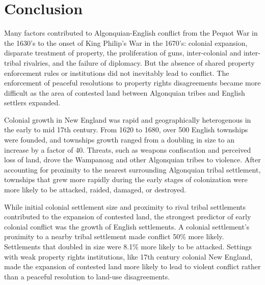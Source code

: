 \documentclass[11pt]{article}
\begin{document}

\section{Conclusion}
Many factors contributed to Algonquian-English conflict from the Pequot War in the 1630's to the onset of King Philip's War in the 1670's:  colonial expansion, disparate treatment of property, the proliferation of guns, inter-colonial and inter-tribal rivalries, and the failure of diplomacy. But the absence of shared property enforcement rules or institutions did not inevitably lead to conflict. The enforcement of peaceful resolutions to property rights disagreements became more difficult as the area of contested land between Algonquian tribes and English settlers expanded. %

Colonial growth in New England was rapid and geographically heterogenous in the early to mid 17th century. From 1620 to 1680, over 500 English townships were founded, and townships growth ranged from a doubling in size to an increase by a factor of 40. Threats, such as weapons confiscation and perceived loss of land, drove the Wampanoag and other Algonquian tribes to violence. After accounting for proximity to the nearest surrounding Algonquian tribal settlement, townships that grew more rapidly during the early stages of colonization were more likely to be attacked, raided, damaged, or destroyed.

While initial colonial settlement size and proximity to rival tribal settlements contributed to the expansion of contested land, the strongest predictor of early colonial conflict was the growth of English settlements. A colonial settlement's proximity to a nearby tribal settlement made conflict 50\% more likely. Settlements that doubled in size were 8.1\% more likely to be attacked. Settings with weak property rights institutions, like 17th century colonial New England, made the expansion of contested land more likely to lead to violent conflict rather than a peaceful resolution to land-use disagreements. 
\pagebreak
\end{document}
